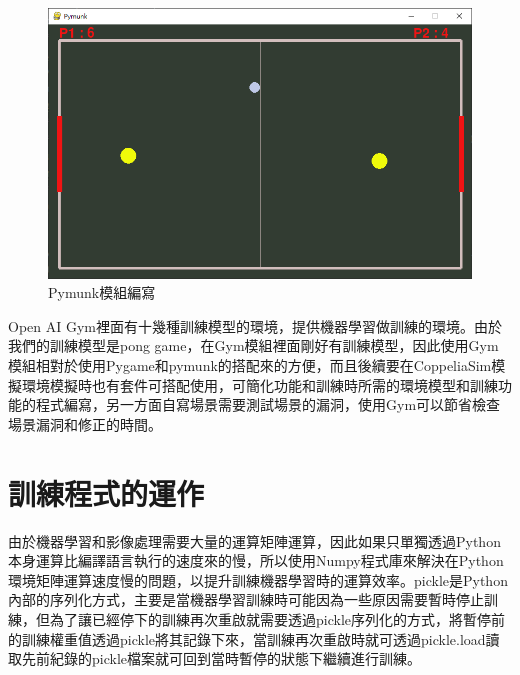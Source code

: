 \documentclass[14pt,a4paper]{report}  %
\begin{document}
\begin{figure}[hbt!]
\begin{center}
\includegraphics[width=12cm]{airhockey_pymunk}
\caption{\Large Pymunk模組編寫}
\label{fig.airhockey_pymunk}
\end{center}
\end{figure}
 \newpage %
 Open AI Gym裡面有十幾種訓練模型的環境，提供機器學習做訓練的環境。由於我們的訓練模型是pong game，在Gym模組裡面剛好有訓練模型，因此使用Gym模組相對於使用Pygame和pymunk的搭配來的方便，而且後續要在CoppeliaSim模擬環境模擬時也有套件可搭配使用，可簡化功能和訓練時所需的環境模型和訓練功能的程式編寫，另一方面自寫場景需要測試場景的漏洞，使用Gym可以節省檢查場景漏洞和修正的時間。\\
\section{訓練程式的運作}
 由於機器學習和影像處理需要大量的運算矩陣運算，因此如果只單獨透過Python本身運算比編譯語言執行的速度來的慢，所以使用Numpy程式庫來解決在Python環境矩陣運算速度慢的問題，以提升訓練機器學習時的運算效率。pickle是Python內部的序列化方式，主要是當機器學習訓練時可能因為一些原因需要暫時停止訓練，但為了讓已經停下的訓練再次重啟就需要透過pickle序列化的方式，將暫停前的訓練權重值透過pickle將其記錄下來，當訓練再次重啟時就可透過pickle.load讀取先前紀錄的pickle檔案就可回到當時暫停的狀態下繼續進行訓練。\\
 
\end{document}

